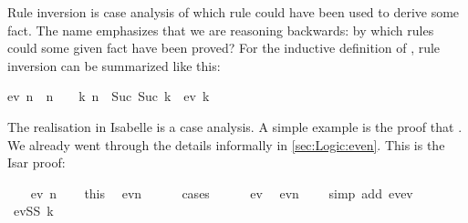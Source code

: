 \begin{isabellebody}
\begin{isamarkuptext}
Rule inversion is case analysis of which rule could have been used to
derive some fact. The name  emphasizes that we are
reasoning backwards: by which rules could some given fact have been proved?
For the inductive definition of , rule inversion can be summarized
like this:
\begin{isabelle}%
ev\ n\ {}\ n\ {}\ {}\ {}\ {}{}k{}\ n\ {}\ Suc\ {}Suc\ k{}\ {}\ ev\ k{}%
\end{isabelle}
The realisation in Isabelle is a case analysis.
A simple example is the proof that . We
already went through the details informally in \autoref{sec:Logic:even}. This
is the Isar proof:%
\end{isamarkuptext}%
\isamarkuptrue%
%
\isadelimproof
%
\endisadelimproof
%
\isatagproof
\ \ \isamarkupfalse%
\ {}ev\ n{}\isanewline
\ \ \isamarkupfalse%
\ this\ \isamarkupfalse%
\ {}ev{}n\ {}\ {}{}{}\isanewline
\ \ \isamarkupfalse%
\ cases\isanewline
\ \ \ \ \isamarkupfalse%
\ ev{}\ \isamarkupfalse%
\ {}ev{}n\ {}\ {}{}{}\ \isamarkupfalse%
\ {}simp\ add{}\ ev{}ev{}{}\isanewline
\ \ \isamarkupfalse%
\isanewline
\ \ \ \ \isamarkupfalse%
\ {}evSS\ k{}\ \isamarkupfalse%

\end{isabellebody}
